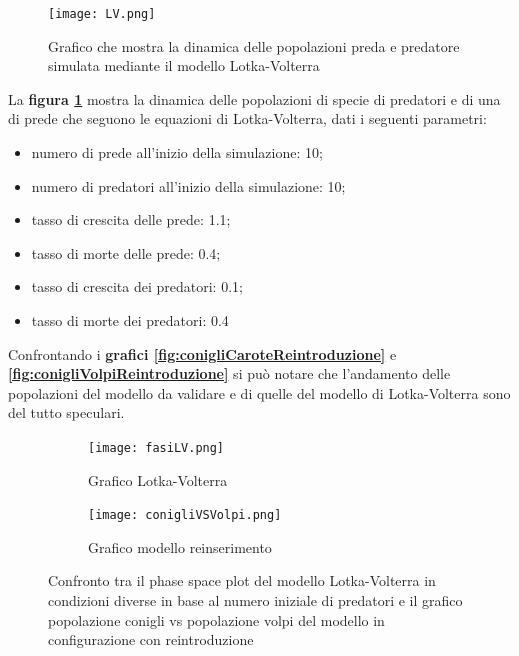 \documentclass[11pt]{article}
\begin{document}
\begin{figure}[h!]
     \centering
     \texttt{[image: LV.png]}
     \caption{Grafico che mostra la dinamica delle popolazioni preda e predatore simulata mediante il modello Lotka-Volterra}
     \label{fig:LVValidazione}
\end{figure}

La \textbf{figura \ref{fig:LVValidazione}} mostra la dinamica delle popolazioni di specie di predatori e di una di prede che seguono le equazioni di Lotka-Volterra, dati i seguenti parametri: 
\begin{itemize}
	\item numero di prede all'inizio della simulazione: 10;
	\item numero di predatori all'inizio della simulazione: 10;
	\item tasso di crescita delle prede: 1.1;
	\item tasso di morte delle prede: 0.4;
	\item tasso di crescita dei predatori: 0.1;
	\item tasso di morte dei predatori: 0.4
\end{itemize}
Confrontando i \textbf{grafici \ref{fig:conigliCaroteReintroduzione}} e \textbf{\ref{fig:conigliVolpiReintroduzione}} si può notare che l'andamento delle popolazioni del modello da validare e di quelle del modello di Lotka-Volterra sono del tutto speculari. 


\begin{figure}[h!]
	\hspace{-5mm}
	\begin{subfigure}{.5\textwidth}
    \centering
     \texttt{[image: fasiLV.png]}
     \caption{Grafico Lotka-Volterra}
     \label{fig:LVPhaseSpace}
	\end{subfigure}
	\begin{subfigure}{.5\textwidth}
		\hspace{10mm}
		\centering
     \texttt{[image: conigliVSVolpi.png]}
     \caption{Grafico modello reinserimento}
     \label{fig:conigliVolpi}
	\end{subfigure}
	\caption{Confronto tra il phase space plot del modello Lotka-Volterra in condizioni diverse in base al numero iniziale di predatori e il grafico popolazione conigli vs popolazione volpi del modello in configurazione con reintroduzione}
\end{figure}
\begin{figure}[h!]
     
\end{figure}
\end{document}
